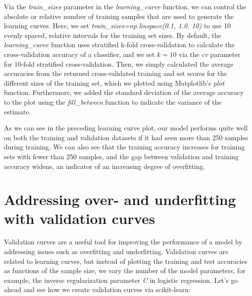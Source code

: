 \documentclass[11pt]{article}
\begin{document}
    Via the \emph{train\_sizes} parameter in the \emph{learning\_curve}
function, we can control the absolute or relative number of training
samples that are used to generate the learning curves. Here, we set
\emph{train\_sizes=np.linspace(0.1, 1.0, 10)} to use 10 evenly spaced,
relative intervals for the training set sizes. By default, the
\emph{learning\_curve} function uses stratified k-fold cross-validation
to calculate the cross-validation accuracy of a classifier, and we set
\(k=10\) via the \emph{cv} parameter for 10-fold stratified
cross-validation. Then, we simply calculated the average accuracies from
the returned cross-validated training and set scores for the different
sizes of the training set, which we plotted using Matplotlib's
\emph{plot} function. Furthermore, we added the standard deviation of
the average accuracy to the plot using the \emph{fill\_between} function
to indicate the variance of the estimate.

As we can see in the preceding learning curve plot, our model performs
quite well on both the training and validation datasets if it had seen
more than 250 samples during training. We can also see that the training
accuracy increases for training sets with fewer than 250 samples, and
the gap between validation and training accuracy widens, an indicator of
an increasing degree of overfitting.

    \section{Addressing over- and underfitting with validation
curves}\label{addressing-over--and-underfitting-with-validation-curves}

    Validation curves are a useful tool for improving the performance of a
model by addressing issues such as overfitting and underfitting.
Validation curves are related to learning curves, but instead of
plotting the training and test accuracies as functions of the sample
size, we vary the number of the model parameters, for example, the
inverse regularization parameter \emph{C} in logistic regression. Let's
go ahead and see how we create validation curves via scikit-learn:
\end{document}
